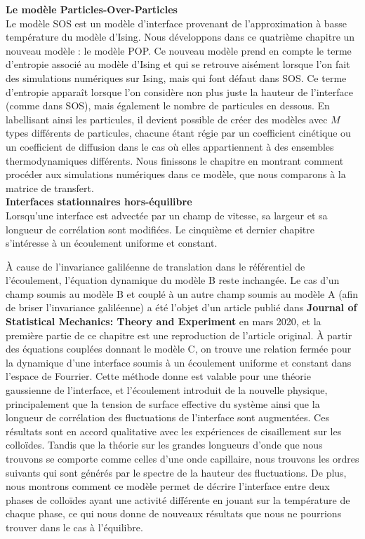 {\bf \large Le modèle Particles-Over-Particles} \\

Le modèle SOS est un modèle d'interface provenant de l'approximation à basse température du modèle d'Ising. Nous développons dans ce quatrième chapitre un nouveau modèle : le modèle POP. Ce nouveau modèle prend en compte le terme d'entropie associé au modèle d'Ising et qui se retrouve aisément lorsque l'on fait des simulations numériques sur Ising, mais qui font défaut dans SOS. Ce terme d'entropie apparaît lorsque l'on considère non plus juste la hauteur de l'interface (comme dans SOS), mais également le nombre de particules en dessous. En labellisant ainsi les particules, il devient possible de créer des modèles avec $M$ types différents de particules, chacune étant régie par un coefficient cinétique ou un coefficient de diffusion dans le cas où elles appartiennent à des ensembles thermodynamiques différents. Nous finissons le chapitre en montrant comment procéder aux simulations numériques dans ce modèle, que nous comparons à la matrice de transfert. \\

{\bf \large Interfaces stationnaires hors-équilibre} \\

Lorsqu'une interface est advectée par un champ de vitesse, sa largeur et sa longueur de corrélation sont modifiées. Le cinquième et dernier chapitre s'intéresse à un écoulement uniforme et constant. 

À cause de l'invariance galiléenne de translation dans le référentiel de l'écoulement, l'équation dynamique du modèle B reste inchangée. Le cas d'un champ soumis au modèle B et couplé à un autre champ soumis au modèle A (afin de briser l'invariance galiléenne) a été l'objet d'un article publié dans {\bf Journal of Statistical Mechanics: Theory and Experiment} en mars 2020, et la première partie de ce chapitre est une reproduction de l'article original. À partir des équations couplées donnant le modèle C, on trouve une relation fermée pour la dynamique d'une interface soumis à un écoulement uniforme et constant dans l'espace de Fourrier. Cette méthode donne est valable pour une théorie gaussienne de l'interface, et l'écoulement introduit de la nouvelle physique, principalement que la tension de surface effective du système ainsi que la longueur de corrélation des fluctuations de l'interface sont augmentées. Ces résultats sont en accord qualitative avec les expériences de cisaillement sur les colloïdes. Tandis que la théorie sur les grandes longueurs d'onde que nous trouvons se comporte comme celles d'une onde capillaire, nous trouvons les ordres suivants qui sont générés par le spectre de la hauteur des fluctuations. De plus, nous montrons comment ce modèle permet de décrire l'interface entre deux phases de colloïdes ayant une activité différente en jouant sur la température de chaque phase, ce qui nous donne de nouveaux résultats que nous ne pourrions trouver dans le cas à l'équilibre.

